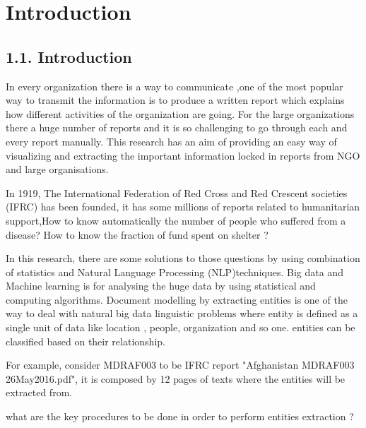 \chapter{Introduction}

\section*{1.1. Introduction}
In every organization there is a way to communicate ,one of the most popular way to transmit the information  is  to produce a written report which explains how different activities of the organization are going. For the large organizations there a huge number of reports and it is so challenging to go through  each and every report manually.
This research has an aim of providing an easy way of visualizing and extracting the important information locked in reports from NGO and large organisations.

In 1919, The International Federation of Red Cross and Red Crescent societies (IFRC) has been founded, it has some millions of reports related to humanitarian support,How to  know automatically the number of people who suffered from a disease?  How to know the  fraction of fund spent on shelter ?  

In this research, there are some solutions to those questions by using combination of statistics and Natural Language Processing (NLP)techniques.
Big data and Machine learning is for analysing the huge data by using statistical and computing algorithms. Document modelling by extracting entities is one of the way to deal with natural big data linguistic problems where entity is defined as a single unit of data like location , people, organization and so one. entities  can be classified based on their relationship.

For example, consider  MDRAF003 to  be IFRC report "Afghanistan MDRAF003 26May2016.pdf", it is composed by 12 pages of texts where the entities will be extracted from. 

what are the key procedures to be done in order to perform entities extraction ?

